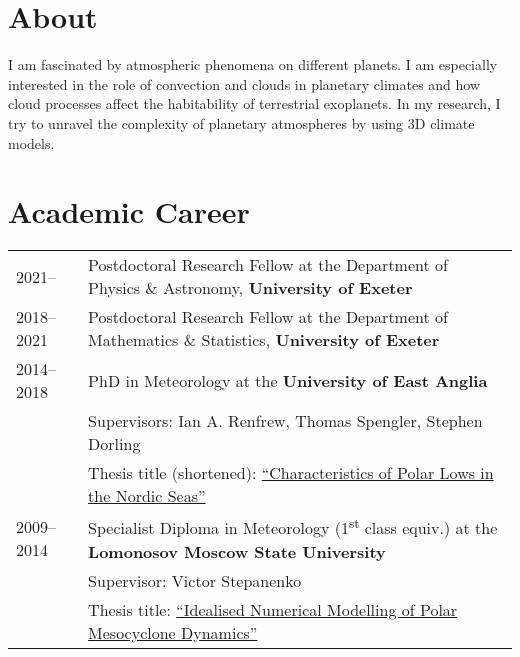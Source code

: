 \documentclass[a4paper, 11pt]{article}
\begin{document}
\thispagestyle{empty}

\keepXColumns



\section{About}
I am fascinated by atmospheric phenomena on different planets.
I am especially interested in the role of convection and clouds in planetary climates and how cloud processes affect the habitability of terrestrial exoplanets.
In my research, I try to unravel the complexity of planetary atmospheres by using 3D climate models.

\section{Academic Career}
\begin{tabularx}{\linewidth}{@{}l X@{}}
2021--     & Postdoctoral Research Fellow at the Department of Physics \& Astronomy, \textbf{University of Exeter} \\
2018--2021 & Postdoctoral Research Fellow at the Department of Mathematics \& Statistics, \textbf{University of Exeter} \\
2014--2018 & PhD in Meteorology at the \textbf{University of East Anglia} \\
& Supervisors: Ian A. Renfrew, Thomas Spengler, Stephen Dorling \\
& Thesis title (shortened): \href{https://ueaeprints.uea.ac.uk/id/eprint/68204/}{``Characteristics of Polar Lows in the Nordic Seas''} \\ %
2009--2014 & Specialist Diploma in Meteorology (1\textsuperscript{st} class equiv.) at the \textbf{Lomonosov Moscow State University}  \\
& Supervisor: Victor Stepanenko \\
& Thesis title: \href{https://figshare.com/articles/thesis/SergeevDE_diploma_pdf/5326846/1}{``Idealised Numerical Modelling of Polar Mesocyclone Dynamics''}\\
\end{tabularx}
\end{document}
